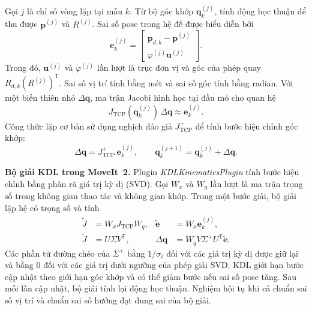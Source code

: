 Gọi \(j\) là chỉ số vòng lặp tại mẫu \(k\). Từ bộ góc khớp \(\mathbf q_k^{(j)}\), tính động học thuận để thu được \(\mathbf p^{(j)}\) và \(R^{(j)}\). Sai số pose trong hệ đế được biểu diễn bởi
\begin{equation}
  \mathbf e_k^{(j)} =
    \begin{bmatrix}
      \mathbf p_{d,k}-\mathbf p^{(j)}\\
      \varphi^{(j)}\mathbf u^{(j)}
    \end{bmatrix}.
  \label{eq:sr5-ik-error}
\end{equation}
Trong đó, \(\mathbf u^{(j)}\) và \(\varphi^{(j)}\) lần lượt là trục đơn vị và góc của phép quay \(R_{d,k}(R^{(j)})^{\mathsf T}\). Sai số vị trí tính bằng mét và sai số góc tính bằng radian. Với một biến thiên nhỏ \(\Delta\mathbf q\), ma trận Jacobi hình học tại đầu mỏ cho quan hệ
\[
  J_{\mathrm{TCP}}(\mathbf q_k^{(j)})\,\Delta\mathbf q
    \approx \mathbf e_k^{(j)}.
\]
Công thức lặp cơ bản sử dụng nghịch đảo giả \(J_{\mathrm{TCP}}^+\) để tính bước hiệu chỉnh góc khớp:
\begin{equation}
  \Delta\mathbf q = J_{\mathrm{TCP}}^+\,\mathbf e_k^{(j)},
  \qquad
  \mathbf q_k^{(j+1)}=\mathbf q_k^{(j)}+\Delta\mathbf q.
  \label{eq:sr5-ik-update}
\end{equation}

\noindent\textbf{Bộ giải KDL trong MoveIt~2.}
Plugin \textit{KDLKinematicsPlugin} tính bước hiệu chỉnh bằng phân rã giá trị kỳ dị (SVD). Gọi \(W_x\) và \(W_q\) lần lượt là ma trận trọng số trong không gian thao tác và không gian khớp. Trong một bước giải, bộ giải lập hệ có trọng số và tính
\begin{equation}
  \begin{aligned}
    \widetilde J &= W_xJ_{\mathrm{TCP}}W_q,
    &\widetilde{\mathbf e} &= W_x\mathbf e_k^{(j)},\\
    \widetilde J &= U\Sigma V^{\mathsf T},
    &\Delta\mathbf q &= W_qV\Sigma^+U^{\mathsf T}\widetilde{\mathbf e}.
  \end{aligned}
  \label{eq:sr5-ik-kdl}
\end{equation}
Các phần tử đường chéo của \(\Sigma^+\) bằng \(1/\sigma_i\) đối với các giá trị kỳ dị được giữ lại và bằng \(0\) đối với các giá trị dưới ngưỡng của phép giải SVD. KDL giới hạn bước cập nhật theo giới hạn góc khớp và có thể giảm bước nếu sai số pose tăng. Sau mỗi lần cập nhật, bộ giải tính lại động học thuận. Nghiệm hội tụ khi cả chuẩn sai số vị trí và chuẩn sai số hướng đạt dung sai của bộ giải.

